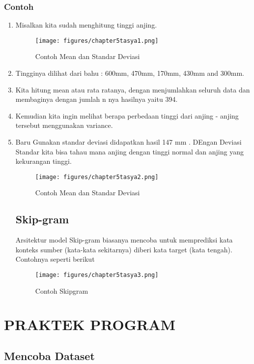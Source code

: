 \subsubsection{Contoh}
\begin{enumerate}
\item Misalkan kita sudah menghitung tinggi anjing.
\begin{figure}[ht]
\centering
\texttt{[image: figures/chapter5tasya1.png]}
\caption{Contoh Mean dan Standar Deviasi }
\label{Teori}
\end{figure}
\item Tingginya dilihat dari bahu : 600mm, 470mm, 170mm, 430mm and 300mm.
\item Kita hitung mean atau rata ratanya, dengan menjumlahkan seluruh data dan membaginya dengan jumlah n nya hasilnya yaitu 394.
\item Kemudian kita ingin melihat berapa perbedaan tinggi dari anjing - anjing tersebut menggunakan variance. 
\item Baru Gunakan standar deviasi didapatkan hasil 147 mm . DEngan Deviasi Standar kita bisa tahau mana anjing dengan tinggi normal dan anjing yang kekurangan tinggi.
\begin{figure}[ht]
\centering
\texttt{[image: figures/chapter5tasya2.png]}
\caption{Contoh Mean dan Standar Deviasi }
\label{Teori}
\end{figure}

\subsection{Skip-gram}
Arsitektur model Skip-gram biasanya  mencoba untuk memprediksi kata konteks sumber (kata-kata sekitarnya) diberi kata target (kata tengah). Contohnya seperti berikut 
\begin{figure}[ht]
\centering
\texttt{[image: figures/chapter5tasya3.png]}
\caption{Contoh Skipgram }
\label{Teori}
\end{figure}
\end{enumerate}



\section{PRAKTEK PROGRAM}
\subsection{Mencoba Dataset}
